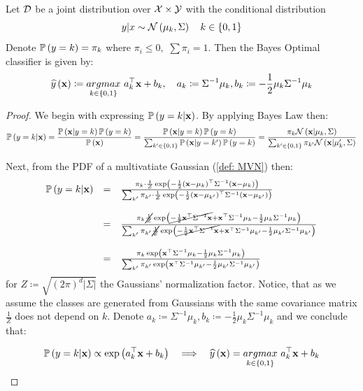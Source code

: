\begin{claim}
Let $\mathcal{D}$ be a joint distribution over $\mathcal{X}\times \mathcal{Y}$ with the conditional distribution $$y|x\sim\mathcal{N}\left(\mu_k,\Sigma\right)\quad k\in\left\{0,1\right\}$$ Denote $\mathbb{P}\left(y=k\right)=\pi_k$ where $\pi_i\leq 0,\,\,\sum\pi_i = 1$. Then the Bayes Optimal classifier is given by: $$ \widehat{y}\left(\mathbf{x}\right) \coloneqq \underset{k\in\left\{0,1\right\}}{argmax}\,\, a_k^\top \mathbf{x} + b_k, \quad a_k \coloneqq \Sigma^{-1}\mu_k, b_k\coloneqq -\frac{1}{2}\mu_k\Sigma^{-1}\mu_k $$ 
\end{claim}
\begin{proof}
We begin with expressing $\mathbb{P}\left(y=k|\mathbf{x}\right)$. By applying Bayes Law then:
$$
\mathbb{P}\left(y=k|\mathbf{x}\right) = 
\frac{\mathbb{P}\left(\mathbf{x}|y=k\right)\mathbb{P}\left(y=k\right)}{\mathbb{P}\left(\mathbf{x}\right)} = \frac{\mathbb{P}\left(\mathbf{x}|y=k\right)\mathbb{P}\left(y=k\right)}{\sum_{k'\in\left\{0,1\right\}}\mathbb{P}\left(\mathbf{x}|y=k'\right)\mathbb{P}\left(y=k\right)} = \frac{\pi_k\mathcal{N}\left(\mathbf{x}|\mu_k,\Sigma\right)}{\sum_{k'\in\left\{0,1\right\}}\pi_{k'}\mathcal{N}\left(\mathbf{x}|\mu_k',\Sigma\right)}
$$

Next, from the PDF of a multivatiate Gaussian (\ref{def: MVN}) then:
$$
\begin{array}{ccl}
\mathbb{P}\left(y=k|\mathbf{x}\right) & = & \frac{\pi_k\cdot\frac{1}{Z}\exp\left(-\frac{1}{2}\left(\mathbf{x}-\mu_k\right)^\top\Sigma^{-1}\left(\mathbf{x}-\mu_k\right)\right)}{\sum_{k'} \pi_{k'}\cdot\frac{1}{Z}\exp\left(-\frac{1}{2}\left(\mathbf{x}-\mu_{k'}\right)^\top\Sigma^{-1}\left(\mathbf{x}-\mu_{k'}\right)\right)} \\
&  & \\
& = & \frac{\pi_k\cancel{\frac{1}{Z}}\exp\left(\cancel{-\frac{1}{2}\mathbf{x}^\top\Sigma^{-1}\mathbf{x}} + \mathbf{x}^\top \Sigma^{-1}\mu_k - \frac{1}{2}\mu_k\Sigma^{-1}\mu_k\right)}{\sum_{k'}\pi_{k'}\cancel{\frac{1}{Z}}\exp\left(\cancel{-\frac{1}{2}\mathbf{x}^\top\Sigma^{-1}\mathbf{x}} + \mathbf{x}^\top \Sigma^{-1}\mu_{k'} - \frac{1}{2}\mu_{k'}\Sigma^{-1}\mu_{k'}\right)} \\
&  & \\
& = & \frac{\pi_k\exp\left(\mathbf{x}^\top \Sigma^{-1}\mu_k - \frac{1}{2}\mu_k\Sigma^{-1}\mu_k\right)}{\sum_{k'}\pi_{k'}\exp\left(\mathbf{x}^\top \Sigma^{-1}\mu_{k'} - \frac{1}{2}\mu_{k'}\Sigma^{-1}\mu_{k'}\right)} 
\end{array}
$$
for $Z\coloneqq \sqrt{\left(2\pi\right)^d\left|\Sigma\right|}$ the Gaussians' normalization factor. Notice, that as we assume the classes are generated from Gaussians with the same covariance matrix $\frac{1}{Z}$ does not depend on $k$. Denote $a_k \coloneqq \Sigma^{-1}\mu_k, b_k\coloneqq -\frac{1}{2}\mu_k\Sigma^{-1}\mu_k$ and we conclude that:

$$
\mathbb{P}\left(y=k|\mathbf{x}\right) \propto \exp\left(a_k^\top \mathbf{x} + b_k\right) \quad \Longrightarrow \quad \widehat{y}\left(\mathbf{x}\right) = \underset{k\in\left\{0,1\right\}}{argmax}\,\, a_k^\top \mathbf{x} + b_k
$$
\end{proof}

